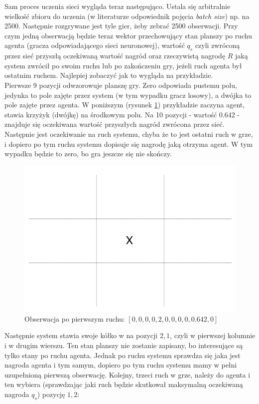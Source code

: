 \documentclass[licencjacka]{pracamgr}
\begin{document}
Sam proces uczenia sieci wygląda teraz następująco. Ustala się arbitralnie wielkość zbioru do uczenia (w literaturze odpowiednik pojęcia \textit{batch size}) np. na 2500. Następnie rozgrywane jest tyle gier, żeby zebrać 2500 obserwacji. Przy czym jedną obserwacją będzie teraz wektor przechowujący stan planszy po ruchu agenta (gracza odpowiadającego sieci neuronowej), wartość $q_{s}$ czyli zwróconą przez sieć przyszłą oczekiwaną wartość nagród  oraz rzeczywistą nagrodę $R$  jaką system zwrócił po swoim ruchu lub po zakończeniu gry, jeżeli ruch agenta był ostatnim ruchem. Najlepiej zobaczyć jak to wygląda na przykładzie.\\

Pierwsze 9 pozycji odwzorowuje planszę gry. Zero odpowiada pustemu polu, jedynka to pole zajęte przez system (w tym wypadku gracz losowy), a dwójka to pole zajęte przez agenta.
W poniższym (rysunek \ref{Rys27}) przykładzie zaczyna agent, stawia krzyżyk (dwójkę) na środkowym polu. Na 10 pozycji  - wartość 0.642  - znajduje się oczekiwana wartość przyszłych nagród zwrócona przez sieć. Następnie jest oczekiwanie na ruch systemu, chyba że to jest ostatni ruch w grze, i dopiero po tym ruchu systemu dopisuje się nagrodę jaką otrzyma agent. W tym wypadku będzie to zero, bo gra jeszcze się nie skończy.

 
\begin{figure}[H]
	\includegraphics [scale=0.2] {ttt_6.png}
	\caption{Obserwacja po pierwszym ruchu: $[0, 0, 0, 0, 2, 0, 0, 0, 0, 0.642, 0]$}
	\label{Rys27}
\end{figure}

 Następnie system stawia swoje kółko w na pozycji $2,1$, czyli w pierwszej kolumnie i w drugim wierszu. Ten stan planszy nie zostanie zapisany, bo interesujące są tylko stany po ruchu agenta. Jednak po ruchu systemu sprawdza się jaka jest nagroda agenta i tym samym, dopiero po tym ruchu systemu mamy w pełni uzupełnioną pierwszą obserwację. Kolejny, trzeci ruch w grze, należy do agenta i ten wybiera (sprawdzając jaki ruch będzie skutkował maksymalną oczekiwaną nagroda $q_{s}$) pozycję $1,2$:
 
\end{document}
